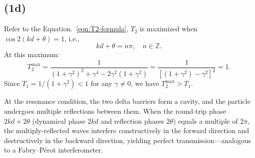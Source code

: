 \documentclass[a4paper,11pt]{article}
\begin{document}
\subsection{(1d)}

Refer to the Equation.~\ref{eqn:T2-formula}, $T_2$ is maximized when $\cos 2(kd + \theta) = 1$, i.e.,
\begin{equation}
    kd + \theta = n\pi, \quad n \in \mathbb{Z}.
\end{equation}
At this maximum:
\begin{equation}
    T_2^{\max} = \frac{1}{(1+\gamma^2)^2 + \gamma^4 - 2\gamma^2(1+\gamma^2)} = \frac{1}{\left[(1+\gamma^2) - \gamma^2\right]^2} = 1.
\end{equation}
Since $T_1 = 1/(1+\gamma^2) < 1$ for any $\gamma \neq 0$, we have $T_2^{\max} > T_1$.

At the resonance condition, the two delta barriers form a cavity, and the particle undergoes multiple reflections between them. When the round-trip phase $2kd + 2\theta$ (dynamical phase $2kd$ and reflection phases $2\theta$) equals a multiple of $2\pi$, the multiply-reflected waves interfere constructively in the forward direction and destructively in the backward direction, yielding perfect transmission---analogous to a Fabry--P\'{e}rot interferometer.
\end{document}

